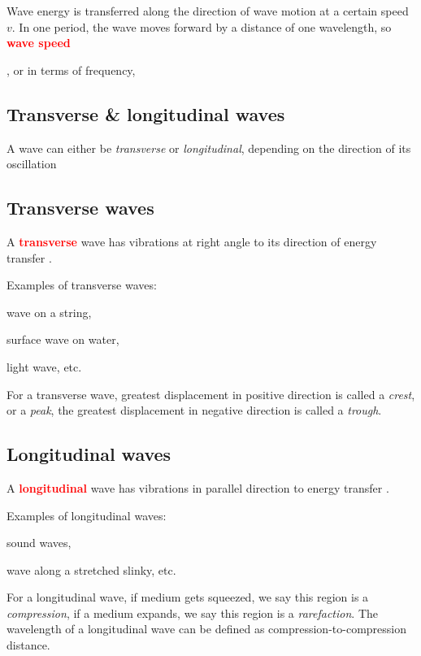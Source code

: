 \documentclass[a4paper,12pt]{book}
\newenvironment{ilight}
  {\centering
  	\vspace*{6pt}
  	\begin{tcolorbox}[colframe=Gray,colback=LightGrey!15]
  \setlength{\baselineskip}{\baselineskip}%
  }
  {\end{tcolorbox}\vspace*{-4pt}}
\newcommand{\keypoint}[1]{\textbf{\textcolor{red}{#1}}}
\newcommand{\titem}{\item}
\newcommand{\tcbhighmath}[1]{\boxed{#1}}
\newcommand{\keypoint}[1]{\textbf{\textcolor{red}{#1}}}
\begin{document}
Wave energy is transferred along the direction of wave motion at a certain speed $v$. In one period, the wave moves forward by a distance of one wavelength, so \keypoint{wave speed} , or in terms of frequency, 

\subsection{Transverse \& longitudinal waves}

A wave can either be \emph{transverse} or \emph{longitudinal}, depending on the direction of its oscillation

\subsection{Transverse waves}

\begin{ilight}
	\centering A \keypoint{transverse} wave has vibrations at right angle to its direction of energy transfer .
\end{ilight}

Examples of transverse waves: 
\titem wave on a string, 
\titem surface wave on water, 
\titem light wave, etc.

For a transverse wave, greatest displacement in positive direction is called a \emph{crest}, or a \emph{peak}, the greatest displacement in negative direction is called a \emph{trough}.

\subsection{Longitudinal waves} \label{ch-Lwaves}

\begin{ilight}
	\centering A \keypoint{longitudinal} wave has vibrations in parallel direction to energy transfer .
\end{ilight}

Examples of longitudinal waves: 
\titem sound waves, 
\titem wave along a stretched slinky, etc.

For a longitudinal wave, if medium gets squeezed, we say this region is a \emph{compression}, if a medium expands, we say this region is a \emph{rarefaction}.  The wavelength of a longitudinal wave can be defined as compression-to-compression distance.
\end{document}

